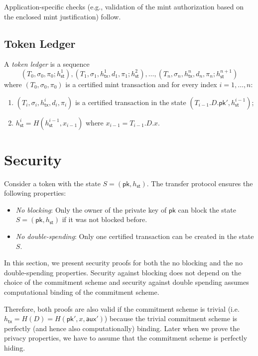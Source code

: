 \documentclass{article}
\newcommand{\pubkey}[0]{\mathsf{pk}}
\newcommand{\sthash}[0]{h_\mathsf{st}}
\newcommand{\txhash}[0]{h_\mathsf{tx}}
\newcommand{\auxd}[0]{\mathsf{aux}}
\begin{document}
\noindent Application-specific checks (e.g., validation of the mint authorization based on the enclosed mint justification) follow.

\subsection{Token Ledger}

A \emph{token ledger} is a sequence
\[
(T_0, \sigma_0, \pi_0; h^1_\mathsf{st}), (T_1, \sigma_1,\txhash^1,d_1,\pi_1; h^2_\mathsf{st}), \ldots, (T_n, \sigma_n, \txhash^n, d_n,\pi_n; h^{n+1}_\mathsf{st})
\]
where $(T_0, \sigma_0, \pi_0)$ is a certified mint transaction and for every index $i=1,\ldots, n$:
\begin{enumerate}
\item $(T_{i}, \sigma_{i}, \txhash^i,d_i, \pi_{i})$ is a certified transaction in the state $(T_{i-1}.D.\pubkey', h^{i-1}_\mathsf{st})$;
\item $h^{i}_\mathsf{st}=H(h^{i-1}_\mathsf{st},x_{i-1})$ where $x_{i-1} =T_{i-1}.D.x$.
\end{enumerate}

\section{Security}
Consider a token with the state $S = (\pubkey, \sthash)$. The transfer protocol ensures the following properties:
\begin{itemize}
\item \emph{No blocking}:
Only the owner of the private key of $\pubkey$ can block the state $S = (\pubkey, \sthash)$ if it was not blocked before.
\item \emph{No double-spending}:
Only one certified transaction can be created in the state $S$.
\end{itemize}

\noindent In this section, we present security proofs for both the no blocking and the no double-spending properties. Security against blocking does not depend on the choice of the commitment scheme and security against double spending assumes computational binding of the commitment scheme.

Therefore, both proofs are also valid if the commitment scheme is trivial (i.e. $\txhash = H(D)=H(\pubkey',x,\auxd')$) because the trivial commitment scheme is perfectly (and hence also computationally) binding. Later when we prove the privacy properties, we have to assume that the commitment scheme is perfectly hiding.
\end{document}
